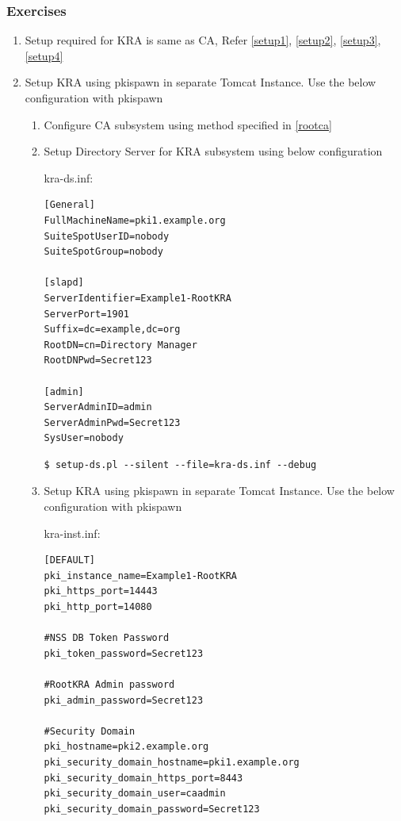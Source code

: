 \documentclass[a4paper]{article}
\begin{document}
\subsubsection{Exercises}
    \begin{enumerate}[label*=\arabic*.]
        \item Setup required for KRA is same as CA, Refer \ref{setup1}, \ref{setup2}, \ref{setup3}, \ref{setup4}
        \item Setup KRA using pkispawn in separate Tomcat Instance. Use the below configuration with pkispawn
            \begin{enumerate}[label*=\arabic*.]
                \item Configure CA subsystem using method specified in \ref{rootca}
                \item Setup Directory Server for KRA subsystem using below configuration 

                    kra-ds.inf:
                    \begin{lstlisting}[style=configFile]
[General]
FullMachineName=pki1.example.org
SuiteSpotUserID=nobody
SuiteSpotGroup=nobody

[slapd]
ServerIdentifier=Example1-RootKRA
ServerPort=1901
Suffix=dc=example,dc=org
RootDN=cn=Directory Manager
RootDNPwd=Secret123

[admin]
ServerAdminID=admin
ServerAdminPwd=Secret123
SysUser=nobody
                    \end{lstlisting}
                    \begin{lstlisting}[style=bashInputStyle]
$ setup-ds.pl --silent --file=kra-ds.inf --debug            
                    \end{lstlisting}
                \item \label{kra_sep_tomcat} Setup KRA using pkispawn in separate Tomcat Instance. Use the below configuration with pkispawn
                    
                    kra-inst.inf:
                    \begin{lstlisting}[style=configFile]
[DEFAULT]
pki_instance_name=Example1-RootKRA
pki_https_port=14443
pki_http_port=14080

#NSS DB Token Password
pki_token_password=Secret123

#RootKRA Admin password
pki_admin_password=Secret123

#Security Domain
pki_hostname=pki2.example.org
pki_security_domain_hostname=pki1.example.org
pki_security_domain_https_port=8443
pki_security_domain_user=caadmin
pki_security_domain_password=Secret123


\end{lstlisting}
\end{enumerate}
\end{enumerate}
\end{document}
